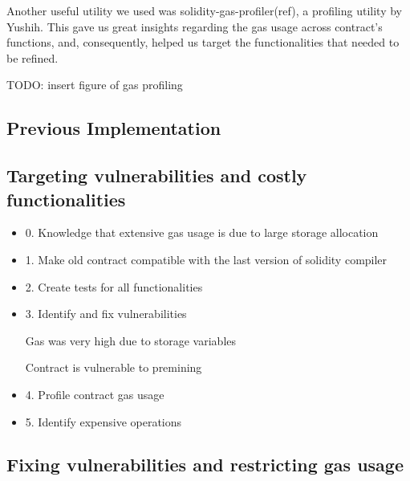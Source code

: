 \documentclass{article}
\begin{document}
  Another useful utility we used was solidity-gas-profiler(ref), a
  profiling utility by Yushih. This gave us great insights regarding the
  gas usage across contract’s functions, and, consequently, helped us
  target the functionalities that needed to be refined.

  TODO: insert figure of gas profiling

  \subsection{Previous Implementation}

  \subsection{Targeting vulnerabilities and costly functionalities}

  \begin{itemize}
  \item
    0. Knowledge that extensive gas usage is due to large storage
    allocation
  \item
    1. Make old contract compatible with the last version of solidity
    compiler
  \item
    2. Create tests for all functionalities
  \item
    3. Identify and fix vulnerabilities

    Gas was very high due to storage variables

    Contract is vulnerable to premining
  \item
    4. Profile contract gas usage
  \item
    5. Identify expensive operations
  \end{itemize}

  \subsection{Fixing vulnerabilities and restricting gas usage}
\end{document}

